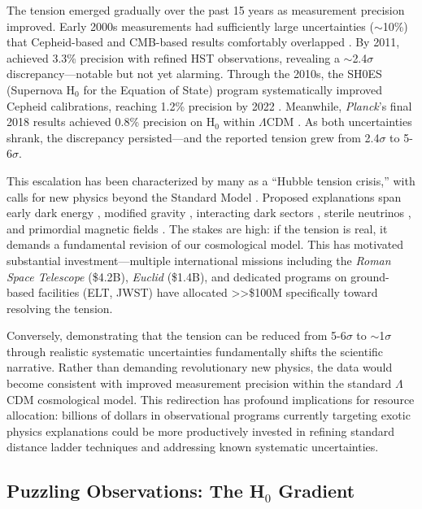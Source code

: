 \documentclass[twocolumn, linenumbers]{aastex701}
\begin{document}
The tension emerged gradually over the past 15 years as measurement precision improved. Early 2000s measurements had sufficiently large uncertainties ($\sim$10\%) that Cepheid-based and CMB-based results comfortably overlapped \citep{Freedman2001, Spergel2003}. By 2011, \citet{Riess2011} achieved 3.3\% precision with refined HST observations, revealing a $\sim$2.4$\sigma$ discrepancy---notable but not yet alarming. Through the 2010s, the SH0ES (Supernova H$_0$ for the Equation of State) program systematically improved Cepheid calibrations, reaching 1.2\% precision by 2022 \citep{Riess2022}. Meanwhile, \textit{Planck}'s final 2018 results achieved 0.8\% precision on H$_0$ within $\Lambda$CDM \citep{Planck2018}. As both uncertainties shrank, the discrepancy persisted---and the reported tension grew from 2.4$\sigma$ to 5-6$\sigma$.

This escalation has been characterized by many as a ``Hubble tension crisis,'' with calls for new physics beyond the Standard Model \citep{DiValentino2021}. Proposed explanations span early dark energy \citep{Poulin2019}, modified gravity \citep{Marra2021}, interacting dark sectors \citep{DiValentino2020}, sterile neutrinos \citep{Anchordoqui2022}, and primordial magnetic fields \citep{Jedamzik2020}. The stakes are high: if the tension is real, it demands a fundamental revision of our cosmological model. This has motivated substantial investment---multiple international missions including the \textit{Roman Space Telescope} (\$4.2B), \textit{Euclid} (\$1.4B), and dedicated programs on ground-based facilities (ELT, JWST) have allocated >>\$100M specifically toward resolving the tension.

Conversely, demonstrating that the tension can be reduced from 5-6$\sigma$ to $\sim$1$\sigma$ through realistic systematic uncertainties fundamentally shifts the scientific narrative. Rather than demanding revolutionary new physics, the data would become consistent with improved measurement precision within the standard $\Lambda$CDM cosmological model. This redirection has profound implications for resource allocation: billions of dollars in observational programs currently targeting exotic physics explanations could be more productively invested in refining standard distance ladder techniques and addressing known systematic uncertainties.

\subsection{Puzzling Observations: The H$_0$ Gradient}
\end{document}
